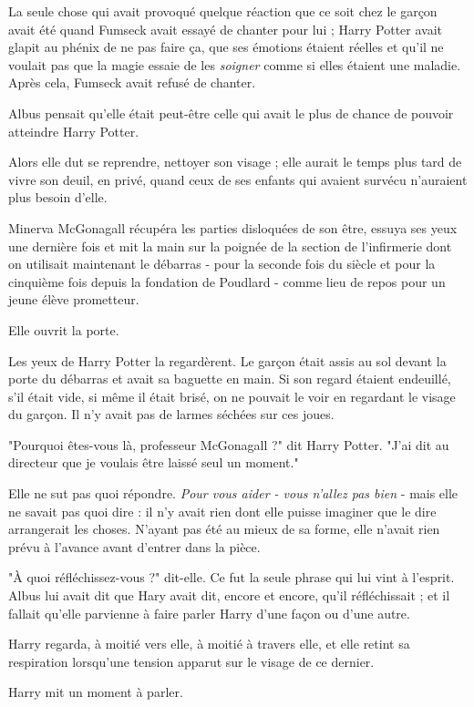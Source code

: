 La seule chose qui avait provoqué quelque réaction que ce soit chez le garçon avait été quand Fumseck avait essayé de chanter pour lui ; Harry Potter avait glapit au phénix de ne pas faire ça, que ses émotions étaient réelles et qu'il ne voulait pas que la magie essaie de les \emph{soigner}  comme si elles étaient une maladie. Après cela, Fumseck avait refusé de chanter.

Albus pensait qu'elle était peut-être celle qui avait le plus de chance de pouvoir atteindre Harry Potter.

Alors elle dut se reprendre, nettoyer son visage ; elle aurait le temps plus tard de vivre son deuil, en privé, quand ceux de ses enfants qui avaient survécu n'auraient plus besoin d'elle.

Minerva McGonagall récupéra les parties disloquées de son être, essuya ses yeux une dernière fois et mit la main sur la poignée de la section de l'infirmerie dont on utilisait maintenant le débarras - pour la seconde fois du siècle et pour la cinquième fois depuis la fondation de Poudlard - comme lieu de repos pour un jeune élève prometteur.

Elle ouvrit la porte.

Les yeux de Harry Potter la regardèrent. Le garçon était assis au sol devant la porte du débarras et avait sa baguette en main. Si son regard étaient endeuillé, s'il était vide, si même il était brisé, on ne pouvait le voir en regardant le visage du garçon. Il n'y avait pas de larmes séchées sur ces joues.

"Pourquoi êtes-vous là, professeur McGonagall ?" dit Harry Potter. "J'ai dit au directeur que je voulais être laissé seul un moment."

Elle ne sut pas quoi répondre. \emph{Pour vous aider - vous n'allez pas bien}  - mais elle ne savait pas quoi dire : il n'y avait rien dont elle puisse imaginer que le dire arrangerait les choses. N'ayant pas été au mieux de sa forme, elle n'avait rien prévu à l'avance avant d'entrer dans la pièce.

"À quoi réfléchissez-vous ?" dit-elle. Ce fut la seule phrase qui lui vint à l'esprit. Albus lui avait dit que Hary avait dit, encore et encore, qu'il réfléchissait ; et il fallait qu'elle parvienne à faire parler Harry d'une façon ou d'une autre.

Harry regarda, à moitié vers elle, à moitié à travers elle, et elle retint sa respiration lorsqu'une tension apparut sur le visage de ce dernier.

Harry mit un moment à parler.

